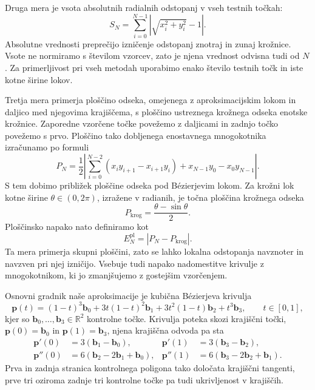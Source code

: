 \documentclass[a4paper,11pt]{article}
\theoremstyle{definition}
\theoremstyle{remark}
\begin{document}
Druga mera je vsota absolutnih radialnih odstopanj v vseh testnih točkah:
\begin{equation}
  S_N=\sum_{i=0}^{N-1}
      \left|\sqrt{x_i^2+y_i^2}-1\right|.
  \label{eq:uvod-vsota}
\end{equation}
Absolutne vrednosti preprečijo izničenje odstopanj znotraj in zunaj
krožnice. Vsote ne normiramo s številom vzorcev, zato je njena vrednost
odvisna tudi od $N$. Za primerljivost pri vseh metodah uporabimo enako
število testnih točk in iste kotne širine lokov.

Tretja mera primerja ploščino odseka, omejenega z aproksimacijskim lokom
in daljico med njegovima krajiščema, s ploščino ustreznega krožnega
odseka enotske krožnice. Zaporedne vzorčene točke povežemo z daljicami
in zadnjo točko povežemo s prvo. Ploščino tako dobljenega enostavnega
mnogokotnika izračunamo po formuli
\begin{equation}
  P_N=\frac{1}{2}\left|
      \sum_{i=0}^{N-2}(x_i y_{i+1}-x_{i+1}y_i)
      +x_{N-1}y_0-x_0y_{N-1}\right|.
  \label{eq:uvod-ploscina}
\end{equation}
S tem dobimo približek ploščine odseka pod Bézierjevim lokom.
Za krožni lok kotne širine $\theta\in(0,2\pi)$, izražene v radianih,
je točna ploščina krožnega odseka
\begin{equation}
  P_{\mathrm{krog}}=\frac{\theta-\sin\theta}{2}.
\end{equation}
Ploščinsko napako nato definiramo kot
\begin{equation}
  E_N^{\mathrm{pl}}=\left|P_N-P_{\mathrm{krog}}\right|.
\end{equation}
Ta mera primerja skupni ploščini, zato se lahko lokalna odstopanja
navznoter in navzven pri njej izničijo. Vsebuje tudi napako nadomestitve
krivulje z mnogokotnikom, ki jo zmanjšujemo z gostejšim vzorčenjem.

Osnovni gradnik naše aproksimacije je kubična Bézierjeva krivulja
\begin{equation}
  \mathbf{p}(t)=(1-t)^3\mathbf{b}_0
      +3t(1-t)^2\mathbf{b}_1
      +3t^2(1-t)\mathbf{b}_2+t^3\mathbf{b}_3,
  \qquad t\in[0,1],
\end{equation}
kjer so $\mathbf{b}_0,\ldots,\mathbf{b}_3\in\mathbb{R}^2$ kontrolne
točke. Krivulja poteka skozi krajiščni točki,
$\mathbf{p}(0)=\mathbf{b}_0$ in $\mathbf{p}(1)=\mathbf{b}_3$,
njena krajiščna odvoda pa sta
\begin{equation}
  \begin{aligned}
    \mathbf{p}'(0)&=3(\mathbf{b}_1-\mathbf{b}_0), &
    \mathbf{p}'(1)&=3(\mathbf{b}_3-\mathbf{b}_2),\\
    \mathbf{p}''(0)&=6(\mathbf{b}_2-2\mathbf{b}_1+\mathbf{b}_0), &
    \mathbf{p}''(1)&=6(\mathbf{b}_3-2\mathbf{b}_2+\mathbf{b}_1).
  \end{aligned}
\end{equation}
Prva in zadnja stranica kontrolnega poligona tako določata krajiščni
tangenti, prve tri oziroma zadnje tri kontrolne točke pa tudi
ukrivljenost v krajiščih.
\end{document}
